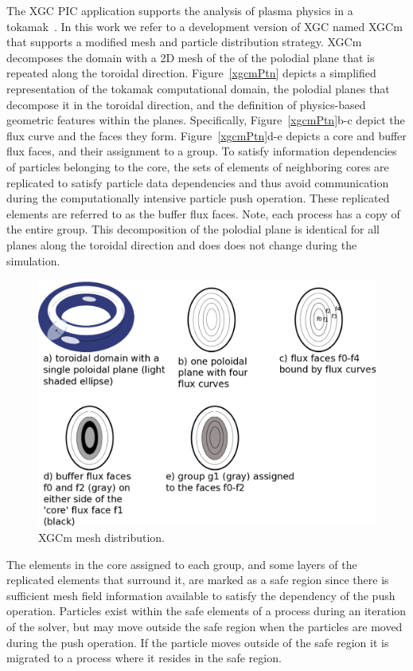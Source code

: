 \documentclass[conference]{IEEEtran}
\begin{document}
The XGC PIC application supports the analysis of plasma physics in a
tokamak~\cite{Ku2016467,ku2009}.
In this work we refer to a development version of XGC named XGCm that supports
a modified mesh and particle distribution strategy.
XGCm decomposes the domain with a 2D mesh of the
of the polodial plane that is repeated along the toroidal direction.
Figure~\ref{xgcmPtn} depicts a simplified representation of the tokamak computational
domain, the polodial planes that decompose it in the toroidal direction, and the
definition of physics-based geometric features within the planes.
Specifically, Figure~\ref{xgcmPtn}b-c depict the flux curve and the faces
they form.
Figure~\ref{xgcmPtn}d-e depicts a core and buffer flux faces,
and their assignment to a group.
To satisfy information dependencies of particles belonging to the core,
the sets of elements of neighboring cores are replicated to satisfy
particle data dependencies and thus avoid communication during the
computationally intensive particle push operation.
These replicated elements are referred to as the buffer flux faces.
Note, each process has a copy of the entire group.
This decomposition of the polodial plane is identical for all planes along the
toroidal direction and does does not change during the simulation.

\begin{figure}[!ht]
  \centering
  \includegraphics[width=.4\textwidth]{../figures/xgcm_partition.png}
  \caption{XGCm mesh distribution.}
  \label{fig:xgcmPtn}
\end{figure}

The elements in the core assigned to each group, and some layers of the
replicated elements that surround it, are marked as a safe region since there is
sufficient mesh field information available to satisfy the dependency of the
push operation.
Particles exist within the safe elements of a process during an iteration of the
solver, but may move outside the safe region when the particles are moved during
the push operation.
If the particle moves outside of the safe region it is migrated to a process
where it resides in the safe region.
\end{document}
